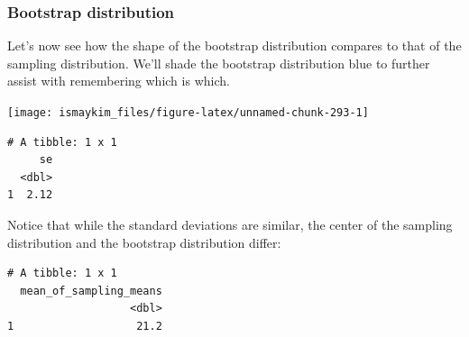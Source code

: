 \documentclass[12pt, krantz2,]{krantz}
\makeatletter
\newenvironment{Shaded}{\begin{snugshade}}{\end{snugshade}}
\newcommand{\DataTypeTok}[1]{\textcolor[rgb]{0.27,0.27,0.27}{#1}}
\newcommand{\DecValTok}[1]{\textcolor[rgb]{0.06,0.06,0.06}{#1}}
\newcommand{\KeywordTok}[1]{\textcolor[rgb]{0.27,0.27,0.27}{\textbf{#1}}}
\newcommand{\NormalTok}[1]{#1}
\newcommand{\OperatorTok}[1]{\textcolor[rgb]{0.43,0.43,0.43}{\textbf{#1}}}
\newcommand{\StringTok}[1]{\textcolor[rgb]{0.5,0.5,0.5}{#1}}
\newenvironment{kframe}{%
\medskip{}
\setlength{\fboxsep}{.8em}
 \def\at@end@of@kframe{}%
 \ifinner\ifhmode%
  \def\at@end@of@kframe{\end{minipage}}%
  \begin{minipage}{\columnwidth}%
 \fi\fi%
 \def\FrameCommand##1{\hskip\@totalleftmargin \hskip-\fboxsep
 \colorbox{shadecolor}{##1}\hskip-\fboxsep
     \hskip-\linewidth \hskip-\@totalleftmargin \hskip\columnwidth}%
 \MakeFramed {\advance\hsize-\width
   \@totalleftmargin\z@ \linewidth\hsize
   \@setminipage}}%
 {\par\unskip\endMakeFramed%
 \at@end@of@kframe}
\renewenvironment{Shaded}{\begin{kframe}}{\end{kframe}}
\makeatother
\begin{document}
\hypertarget{bootstrap-distribution}{%
\subsubsection*{Bootstrap distribution}\label{bootstrap-distribution}}


Let's now see how the shape of the bootstrap distribution compares to that of the sampling distribution. We'll shade the bootstrap distribution blue to further assist with remembering which is which.

\begin{Shaded}
\end{Shaded}

\begin{center}\texttt{[image: ismaykim\_files/figure-latex/unnamed-chunk-293-1]} \end{center}

\begin{Shaded}
\end{Shaded}

\begin{verbatim}
# A tibble: 1 x 1
     se
  <dbl>
1  2.12
\end{verbatim}

Notice that while the standard deviations are similar, the center of the sampling distribution and the bootstrap distribution differ:

\begin{Shaded}
\end{Shaded}

\begin{verbatim}
# A tibble: 1 x 1
  mean_of_sampling_means
                   <dbl>
1                   21.2
\end{verbatim}
\end{document}
